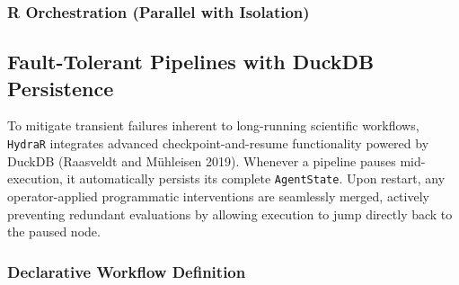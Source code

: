 \documentclass[10pt,a4paper,onecolumn]{article}
\newenvironment{Shaded}{}{}
\newcommand{\AttributeTok}[1]{\textcolor[rgb]{0.49,0.56,0.16}{#1}}
\newcommand{\CharTok}[1]{\textcolor[rgb]{0.25,0.44,0.63}{#1}}
\newcommand{\ConstantTok}[1]{\textcolor[rgb]{0.53,0.00,0.00}{#1}}
\newcommand{\FunctionTok}[1]{\textcolor[rgb]{0.02,0.16,0.49}{#1}}
\newcommand{\KeywordTok}[1]{\textcolor[rgb]{0.00,0.44,0.13}{\textbf{#1}}}
\newcommand{\NormalTok}[1]{#1}
\newcommand{\OtherTok}[1]{\textcolor[rgb]{0.00,0.44,0.13}{#1}}
\newcommand{\SpecialCharTok}[1]{\textcolor[rgb]{0.25,0.44,0.63}{#1}}
\newcommand{\StringTok}[1]{\textcolor[rgb]{0.25,0.44,0.63}{#1}}
\begin{document}
\subsubsection{R Orchestration (Parallel with
Isolation)}\label{r-orchestration-parallel-with-isolation}

\begin{Shaded}
\end{Shaded}

\subsection{Fault-Tolerant Pipelines with DuckDB
Persistence}\label{fault-tolerant-pipelines-with-duckdb-persistence}

To mitigate transient failures inherent to long-running scientific
workflows, \texttt{HydraR} integrates advanced checkpoint-and-resume
functionality powered by DuckDB (Raasveldt and Mühleisen 2019). Whenever
a pipeline pauses mid-execution, it automatically persists its complete
\texttt{AgentState}. Upon restart, any operator-applied programmatic
interventions are seamlessly merged, actively preventing redundant
evaluations by allowing execution to jump directly back to the paused
node.

\subsubsection{Declarative Workflow
Definition}\label{declarative-workflow-definition}

\begin{Shaded}
\end{Shaded}
\end{document}
